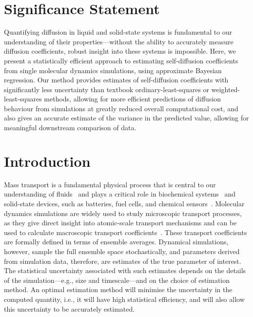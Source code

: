\documentclass[reprint,superscriptaddress,nobibnotes,amsmath,amssymb,aps,prx,hidelinks]{revtex4-2}
\begin{document}
\section*{Significance Statement}
Quantifying diffusion in liquid and solid-state systems is fundamental to our understanding of their properties—without the ability to accurately measure diffusion coefficients, robust insight into these systems is impossible.
Here, we present a statistically efficient approach to estimating self-diffusion coefficients from single molecular dynamics simulations, using approximate Bayesian regression.
Our method provides estimates of self-diffusion coefficients with significantly less uncertainty than textbook ordinary-least-squares or weighted-least-squares methods, allowing for more efficient predictions of diffusion behaviour from simulations at greatly reduced overall computational cost, and also gives an accurate estimate of the variance in the predicted value, allowing for meaningful downstream comparison of data.

\section{Introduction}

Mass transport is a fundamental physical process that is central to our understanding of fluids~\cite{sendner_interfacial_2009,ShimizuEtAl_PhysChemChemPhys2015,ghoufi_ultrafast_2016} and plays a critical role in biochemical systems~\cite{maccmmon_dynamics_1977,RobertsonEtAl_ProcNatlAcadSci2006} and solid-state devices, such as batteries, fuel cells, and chemical sensors~\cite{eames_ionic_2015,morgan_understanding_2011,walsh_taking_2018}.
Molecular dynamics simulations are widely used to study microscopic transport processes, as they give direct insight into atomic-scale transport mechanisms and can be used to calculate macroscopic transport coefficients~\cite{morgan_relationships_2014,morgan_mechanistic_2021,poletayev_defect_2022,klepis_long_2009,wang_application_2011,ZelovichEtAl_ChemMater2019}.
These transport coefficients are formally defined in terms of ensemble averages.
Dynamical simulations, however, sample the full ensemble space stochastically, and parameters derived from simulation data, therefore, are estimates of the true parameter of interest.
The statistical uncertainty associated with such estimates depends on the details of the simulation---e.g., size and timescale---and on the choice of estimation method.
An optimal estimation method will minimise the uncertainty in the computed quantity, i.e., it will have high statistical efficiency, and will also allow this uncertainty to be accurately estimated.
\end{document}
